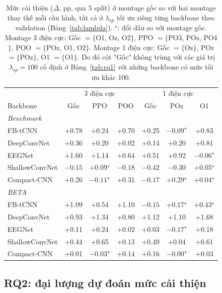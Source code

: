\documentclass[11pt,a4paper,twoside,asymmetric]{article}
\begin{document}
\begin{table}[htbp]
\caption{Mức cải thiện ($\bar\Delta$, pp, qua 5 split) ở montage gốc so với hai montage thay thế mỗi cấu hình, tất cả ở $\lambda_{sp}$ tối ưu riêng từng backbone theo validation (Bảng~\ref{tab:lambda}). $^\star$: đổi dấu so với montage gốc. Montage 3 điện cực: Gốc $=\{$O1, Oz, O2$\}$, PPO $=\{$PO3, POz, PO4$\}$, POO $=\{$POz, O1, O2$\}$. Montage 1 điện cực: Gốc $=\{$Oz$\}$, POz $=\{$POz$\}$, O1 $=\{$O1$\}$. Do đó cột "Gốc" không trùng với các giá trị $\lambda_{sp}=100$ cố định ở Bảng~\ref{tab:rq1} với những backbone có mức tối ưu khác 100.}
\label{tab:rq1b}
\begin{center}
\footnotesize
\begin{tabular}{lcccccc}
\toprule
 & \multicolumn{3}{c}{3 điện cực} & \multicolumn{3}{c}{1 điện cực} \\
Backbone & Gốc & PPO & POO & Gốc & POz & O1 \\
\midrule
\multicolumn{7}{l}{\textit{Benchmark}} \\
FB-tCNN & +0.78 & +0.24 & +0.70 & +0.25 & $-0.09^\star$ & +0.83 \\
DeepConvNet & +0.36 & +0.20 & +0.02 & +0.14 & +0.20 & +0.81 \\
EEGNet & +1.60 & +1.14 & +0.64 & +0.51 & +0.92 & $-0.06^\star$ \\
ShallowConvNet & $-0.15$ & +0.09$^\star$ & $-0.18$ & $-0.42$ & $-0.30$ & +0.05$^\star$ \\
Compact-CNN & +0.26 & $-0.11^\star$ & +0.31 & $-0.17$ & +0.29$^\star$ & +0.04$^\star$ \\
\multicolumn{7}{l}{\textit{BETA}} \\
FB-tCNN & +1.09 & +0.54 & +1.10 & $-0.15$ & +0.17$^\star$ & +0.43$^\star$ \\
DeepConvNet & +0.93 & +1.34 & +0.80 & +1.12 & +1.10 & +1.68 \\
EEGNet & +0.11 & +0.24 & +0.02 & +0.03 & $-0.17^\star$ & +0.18 \\
ShallowConvNet & +0.44 & +0.65 & +0.13 & +0.49 & +0.04 & +0.61 \\
Compact-CNN & +0.01 & $-0.03^\star$ & +0.14 & +0.16 & $-0.00^\star$ & +0.03 \\
\bottomrule
\end{tabular}
\end{center}
\end{table}

\subsection{RQ2: đại lượng dự đoán mức cải thiện}
\label{sec:rq2}
\end{document}
